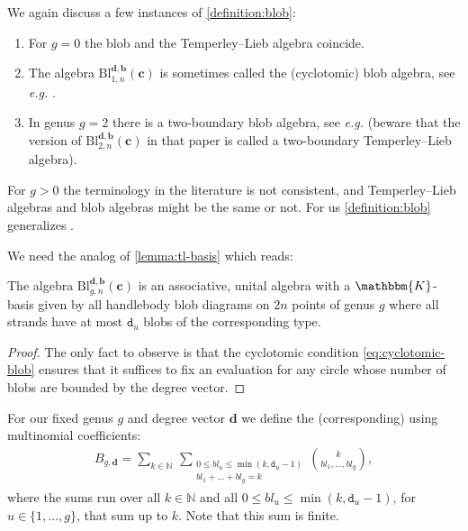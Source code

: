 \documentclass[a4paper,11pt]{amsart}
\let\emph\relax
\newcommand{\eg}{\textsl{e.g.}}
\renewcommand{\dots}{\text{...}}
\newcommand{\setstuff}[1]{\mathrm{#1}}
\newcommand{\KK}{\mathbbm{K}}
\newcommand{\N}{\mathbb{N}}
\newcommand{\bsym}[1]{\boldsymbol{#1}}
\newcommand{\varsym}[1]{\mathtt{#1}}
\newcommand{\cpar}{\bsym{c}}
\newcommand{\bpar}{\bsym{b}}
\newcommand{\dpar}{\bsym{d}}
\newcommand{\dvar}{\varsym{d}}
\numberwithin{equation}{section}
\let\fullref\autoref
\begin{document}
\begin{remark}\label{remark:blob}
We again discuss a few instances of \fullref{definition:blob}:
\begin{enumerate}

\setlength\itemsep{0.15cm}

\item For $g=0$ the blob and the Temperley--Lieb algebra 
coincide.

\item The algebra $\setstuff{Bl}_{1,n}^{\dpar,\bpar}(\cpar)$ 
is sometimes called the (cyclotomic) blob algebra, see {\eg} \cite{MaSa-blob}.

\item In genus $g=2$ there is a two-boundary 
blob algebra, see {\eg} 
\cite{deGiNi-two-boundary-tl} (beware that the version of $\setstuff{Bl}_{2,n}^{\dpar,\bpar}(\cpar)$ 
in that paper is called a two-boundary 
Temperley--Lieb algebra).

\end{enumerate}
For $g>0$
the terminology in the literature is not consistent, and 
Temperley--Lieb algebras and blob algebras might 
be the same or not. For us \fullref{definition:blob} 
generalizes \cite{MaSa-blob}.
\end{remark}

We need the 
analog of \fullref{lemma:tl-basis} which reads:

\begin{lemma}\label{lemma:blob-basis}
The algebra 
$\setstuff{Bl}_{g,n}^{\dpar,\bpar}(\cpar)$ is an associative, unital 
algebra with a $\KK$-basis given by all handlebody blob diagrams 
on $2n$ points of genus 
$g$ where all strands have at most $\dvar_{u}$ 
blobs of the corresponding type.
\end{lemma}

\begin{proof}
The only fact to observe is that 
the cyclotomic condition \eqref{eq:cyclotomic-blob} 
ensures that it suffices to 
fix an evaluation for any circle whose number of blobs are bounded 
by the degree vector.
\end{proof}

For our fixed genus $g$ and degree vector $\dpar$ we define 
the (corresponding) \emph{blob numbers} using multinomial
coefficients:
\begin{gather}\label{eq:blob-numbers}
B_{g,\dpar}=
\sum_{k\in\N}\,
\sum_{\substack{0\leq bl_{u}\leq\min(k,\dvar_{u}-1)\\bl_{1}+\dots+bl_{g}=k}}
\binom{k}{bl_{1},\dots,bl_{g}},
\end{gather}
where the sums run over all $k\in\N$ and all 
$0\leq bl_{u}\leq\min(k,\dvar_{u}-1)$,
for $u\in\{1,\dots,g\}$, that sum up to $k$.
Note that this sum is finite.
\end{document}
